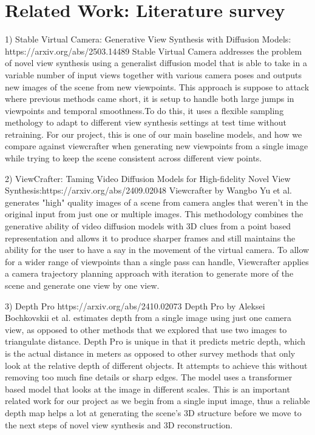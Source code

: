\documentclass{article}
\begin{document}
\section{Related Work: Literature survey}
1) Stable Virtual Camera: Generative View Synthesis with Diffusion Models: https://arxiv.org/abs/2503.14489
Stable Virtual Camera addresses the problem of novel view synthesis using a generalist diffusion model that is able to take in a variable number of input views together with various camera poses and outputs new images of the scene from new viewpoints. This approach is suppose to attack where previous methods came short, it is setup to handle both large jumps in viewpoints and temporal smoothness.To do this, it uses a flexible sampling methology to adapt to different view synthesis settings at test time without retraining. For our project, this is one of our main baseline models, and how we compare against viewcrafter when generating new viewpoints from a single image while trying to keep the scene consistent across different view points.


2) ViewCrafter: Taming Video Diffusion Models for High-fidelity Novel View Synthesis:https://arxiv.org/abs/2409.02048
Viewcrafter by Wangbo Yu et al. generates "high" quality images of a scene from camera angles that weren't in the original input from just one or multiple images. This methodology combines the generative ability of video diffusion models with 3D clues from a point based representation and allows it to produce sharper frames and still maintains the ability for the user to have a say in the movement of the virtual camera. To allow for a wider range of viewpoints than a single pass can handle, Viewcrafter applies a camera trajectory planning approach with iteration to generate more of the scene and generate one view by one view.

3) Depth Pro https://arxiv.org/abs/2410.02073
Depth Pro by Aleksei Bochkovskii et al. estimates depth from a single image using just one camera view, as opposed to other methods that we explored that use two images to triangulate distance. Depth Pro is unique in that it predicts metric depth, which is the actual distance in meters as opposed to other survey methods that only look at the relative depth of different objects. It attempts to achieve this without removing too much fine details or sharp edges. The model uses a transformer based model that looks at the image in different scales. This is an important related work for our project as we begin from a single input image, thus a reliable depth map helps a lot at generating the scene's 3D structure before we move to the next steps of novel view synthesis and 3D reconstruction.
\end{document}
